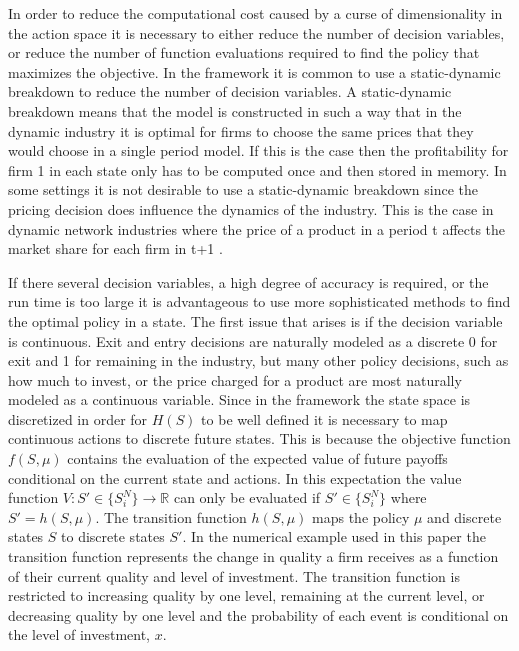 \documentclass[12pt]{article}
\begin{document}
In order to reduce the computational cost caused by a curse of dimensionality in the action space it is necessary to either reduce the number of decision variables, or reduce the number of function evaluations required to find the policy that maximizes the objective. In the \citet{1995_Erickson_Pakes_RES} framework it is common to use a static-dynamic breakdown to reduce the number of decision variables. A static-dynamic breakdown means that the model is constructed in such a way that in the dynamic industry it is optimal for firms to choose the same prices that they would choose in a single period model. If this is the case then the profitability for firm 1 in each state only has to be computed once and then stored in memory. In some settings it is not desirable to use a static-dynamic breakdown since the pricing decision does influence the dynamics of the industry. This is the case in dynamic network industries where the price of a product in a period t affects the market share for each firm in t+1 \citep{2009_Chen_Doraszelski_Harrington, 2006_Mitchell_Skrzypacz, 2006_Chen_Doraszelski}.

If there several decision variables, a high degree of accuracy is required, or the run time is too large it is advantageous to use more sophisticated methods to find the optimal policy in a state. The first issue that arises is if the decision variable is continuous. Exit and entry decisions are naturally modeled as a discrete 0 for exit and 1 for remaining in the industry, but many other policy decisions, such as how much to invest, or the price charged for a product are most naturally modeled as a continuous variable. Since in the \citet{1995_Erickson_Pakes_RES} framework the state space is discretized in order for $H(S)$ to be well defined it is necessary to map continuous actions to discrete future states. This is because the objective function $f(S,\mu)$ contains the evaluation of the expected value of future payoffs conditional on the current state and actions. In this expectation the value function $V : S' \in \{S_i^N\} \rightarrow \mathbb{R}$ can only be evaluated if $S' \in \{S_i^N\}$ where $S'=h(S,\mu)$. The transition function $h(S,\mu)$ maps the policy $\mu$ and discrete states $S$ to discrete states $S'$. In the numerical example used in this paper the transition function represents the change in quality a firm receives as a function of their current quality and level of investment. The transition function is restricted to increasing quality by one level, remaining at the current level, or decreasing quality by one level and the probability of each event is conditional on the level of investment, $x$.
\end{document}

